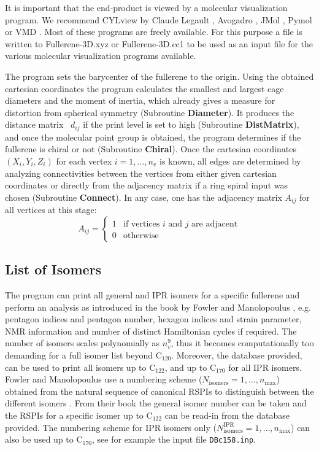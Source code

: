 \documentclass[article,a4paper,twoside]{memoir}
\newcommand{\C}[1]{\ensuremath{\mathrm{C}_{#1}}}
\newcommand{\filename}[1]{\texttt{#1}}
\newcommand{\funname}[1]{{\color{blue}\textbf{#1}}}
\begin{document}
It is important that the end-product is viewed by a molecular visualization program. 
We recommend CYLview by Claude Legault \cite{CYLview}, Avogadro \cite{Avogadro}, JMol \cite{JMol}, Pymol \cite{Pymol} or VMD \cite{vmd}. 
Most of these programs are freely available.  For this purpose a file is written to Fullerene-3D.xyz or Fullerene-3D.cc1 to be used as an input file 
for the various molecular visualization programs available.

The program sets the barycenter of the fullerene 
to the origin. Using the obtained cartesian coordinates the program calculates the smallest and largest cage diameters and the
moment of inertia, which already gives a measure for distortion from spherical symmetry (Subroutine \funname{Diameter}). 
It produces the distance matrix~ $d_{ij}$ if the print level is set to high (Subroutine \funname{DistMatrix}), and once the 
molecular point group is obtained, the program determines if the fullerene is chiral or not (Subroutine \funname{Chiral}).
Once the cartesian coordinates $(X_i, Y_i, Z_i)$ for each vertex $i=1,\dots, n_v$ is known, all edges are determined by 
analyzing connectivities between the vertices from either given cartesian coordinates or directly from the adjacency matrix 
if a ring spiral input was chosen (Subroutine \funname{Connect}). In any case, one has the adjacency matrix $A_{ij}$ for all vertices at this stage:
\begin{equation}
  \label{eq:adjacencymatrix}
  A_{ij} =
  \begin{cases}
    1 & \text{if vertices $i$ and $j$ are adjacent}\\
    0 & \text{otherwise}
  \end{cases}
\end{equation}

\subsection{List of Isomers}
The program can print all general and IPR isomers for a specific fullerene and perform an analysis as introduced 
in the book by Fowler and Manolopoulus \cite{Atlas}, e.g. pentagon indices and 
pentagon number, hexagon indices and strain parameter, NMR information and number of distinct Hamiltonian cycles if 
required. The number of isomers scales polynomially as $n_v^9$, thus it becomes computationally
too demanding for a full isomer list beyond \C{120}. Moreover, the database provided, can be used to print all isomers up to 
\C{122}, and up to \C{170} for all IPR isomers. Fowler and Manolopoulus use a numbering scheme ($N_\mathrm{isomers}= 1,\dots, n_\mathrm{max}$) 
obtained from the natural sequence of canonical RSPIs to distinguish between the different isomers \cite{Atlas}. From their book \cite{Atlas} the
general isomer number can be taken and the RSPIs for a specific isomer up to \C{122} can be read-in from the database provided. 
The numbering scheme for IPR isomers only ($N_\mathrm{isomers}^\mathrm{IPR}= 1,\dots, n_\mathrm{max}$) can also be used up to \C{170}, 
see for example the input file \filename{DBc158.inp}.
\end{document}
